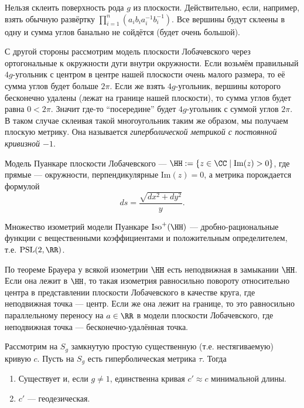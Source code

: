 \documentclass[12pt,a4paper]{article}
\newcommand{\Iso}{\mathrm{Iso}}
\newcommand{\PSL}{\mathrm{PSL}}
\renewcommand{\Im}{\mathrm{Im}}
\begin{document}
    \begin{remark}
        Нельзя склеить поверхность рода $g$ из плоскости. Действительно, если, например, взять обычную развёртку $\prod_{i=1}^n (a_i b_i a_i^{-1} b_i^{-1})$. Все вершины будут склеены в одну и сумма углов банально не сойдётся (будет очень большой).

        С другой стороны рассмотрим модель плоскости Лобачевского через ортогональные к окружности дуги внутри окружности. Если возьмём правильный $4g$-угольник с центром в центре нашей плоскости очень малого размера, то её сумма углов будет больше $2\pi$. Если же взять $4g$-угольник, вершины которого бесконечно удалены (лежат на границе нашей плоскости), то сумма углов будет равна $0 < 2\pi$. Значит где-то ``посередине'' будет $4g$-угольник с суммой углов $2\pi$. В таком случае склеивая такой многоугольник таким же образом, мы получаем плоскую метрику. Она называется \emph{гиперболической метрикой с постоянной кривизной $-1$}.
    \end{remark}

    \begin{definition}
        Модель Пуанкаре плоскости Лобачевского --- $\HH := \{z \in \CC \mid \Im(z) > 0\}$, где прямые --- окружности, перпендикулярные $\Im(z) = 0$, а метрика порождается формулой
        \[ds = \frac{\sqrt{dx^2 + dy^2}}{y}.\]

        Множество изометрий модели Пуанкаре $\Iso^+(\HH)$ --- дробно-рациональные функции с вещественными коэффициентами и положительным определителем, т.е. $\PSL(2, \RR)$.
    \end{definition}

    \begin{remark}
        По теореме Брауера у всякой изометрии $\HH$ есть неподвижная в замыкании $\HH$. Если она лежит в $\HH$, то такая изометрия равносильно повороту относительно центра в представлении плоскости Лобачевского в качестве круга, где неподвижная точка --- центр. Если же она лежит на границе, то это равносильно параллельному переносу на $a \in \RR$ в модели плоскости Лобачевского, где неподвижная точка --- бесконечно-удалённая точка. 
    \end{remark}

    \begin{theorem}
        Рассмотрим на $S_g$ замкнутую простую существенную (т.е. нестягиваемую) кривую $c$. Пусть на $S_g$ есть гиперболическая метрика $\tau$. Тогда
        \begin{enumerate}
            \item Существует и, если $g \neq 1$, единственна кривая $c' \approx c$ минимальной длины.
            \item $c'$ --- геодезическая.
        \end{enumerate}
    \end{theorem}
\end{document}
